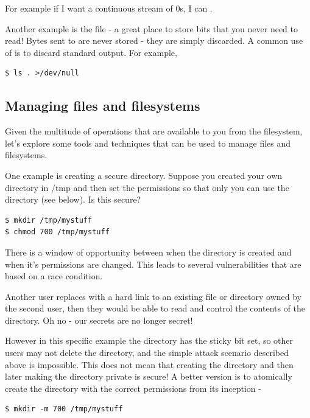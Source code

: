 For example if I want a continuous stream of 0s, I can .

Another example is the file  - a great place to store bits that you never need to read! Bytes sent to  are never stored - they are simply discarded. A common use of  is to discard standard output. For example,

\begin{verbatim}
$ ls . >/dev/null
\end{verbatim}

\subsection{Managing files and filesystems}

Given the multitude of operations that are available to you from the filesystem, let's explore some tools and techniques that can be used to manage files and filesystems.

One example is creating a secure directory. Suppose you created your own directory in /tmp and then set the permissions so that only you can use the directory (see below). Is this secure?

\begin{verbatim}
$ mkdir /tmp/mystuff
$ chmod 700 /tmp/mystuff
\end{verbatim}

There is a window of opportunity between when the directory is created and when it's permissions are changed. This leads to several vulnerabilities that are based on a race condition.

Another user replaces  with a hard link to an existing file or directory owned by the second user, then they would be able to read and control the contents of the  directory. Oh no - our secrets are no longer secret!

However in this specific example the  directory has the sticky bit set, so other users may not delete the  directory, and the simple attack scenario described above is impossible. This does not mean that creating the directory and then later making the directory private is secure! A better version is to atomically create the directory with the correct permissions from its inception -

\begin{verbatim}
$ mkdir -m 700 /tmp/mystuff
\end{verbatim}

